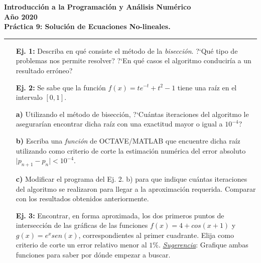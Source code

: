 \documentclass[11pt]{article}
\begin{document}
\renewcommand{\labelitemi}{$\bullet$}
\begin{center}
\large{{\bf Introducci\'on a la Programaci\'on y An\'alisis Num\'erico\\[5pt] A\~no 2020}}\\[5pt]
\large{{\bf Pr\'actica 9: Soluci\'on de Ecuaciones No-lineales.}}\\
\rule{17cm}{1pt}
\bigskip
\end{center}

\begin{itemize}

\subsection*{M\'etodo de Bisecci\'on}


\item[{\bf Ej. 1:}] Describa en qu\'e consiste el m\'etodo de la \textit{bisecci\'on}. ?`Qu\'e tipo de problemas nos permite resolver? ?`En qu\'e casos el algoritmo conducir\'ia a un resultado err\'oneo?

\item[{\bf Ej. 2:}] Se sabe que la funci\'on $f(x)=te^{-t}+t^{2}-1$ tiene una ra\'iz en el intervalo $[0,1]$. 

\item[{\bf a)}] Utilizando el m\'etodo de bisecci\'on, ?`Cu\'antas iteraciones del algoritmo le asegurar\'ian encontrar dicha ra\'iz con una exactitud mayor o igual a $10^{-4}$?

\item[{\bf b)}] Escriba una {\it funci\'on} de OCTAVE/MATLAB que encuentre dicha ra\'iz utilizando como criterio de corte la estimaci\'on num\'erica del error absoluto $\vert p_{n+1}-p_{n}\vert < 10^{-4}$.

\item[{\bf c)}] Modificar el programa del  Ej. 2. b) para que indique cu\'antas iteraciones del algoritmo se realizaron para llegar a la aproximaci\'on requerida. Comparar con los resultados obtenidos anteriormente.

\item[{\bf Ej. 3:}] Encontrar, en forma aproximada, los dos primeros puntos de intersecci\'on de las gr\'aficas de las funciones $f(x) = 4 + cos(x+1)$ y $g(x)=e^x sen(x)$, correspondientes al primer cuadrante. Elija como criterio de corte un error relativo menor al $1\%$.
\underline{\textit{Sugerencia}}: Grafique ambas funciones para saber por d\'onde empezar a buscar.


\end{itemize}
\end{document}
